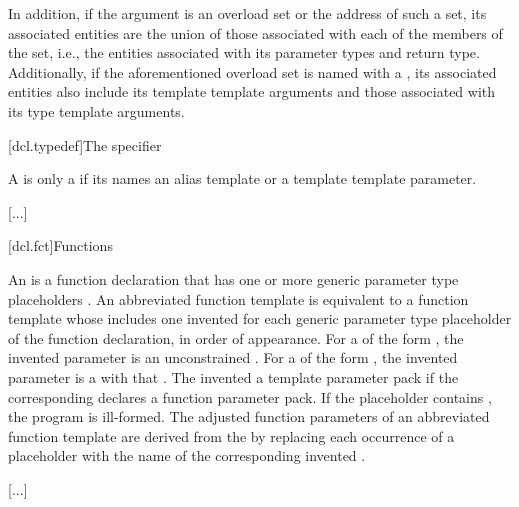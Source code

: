 \documentclass{wg21}
\begin{document}
In addition, if the argument is an overload set or the address of such a set,
its associated entities
are the union of those associated with each of the
members of the set, i.e., the entities associated with its
parameter types and return type.
Additionally, if the aforementioned overload set is named with
a , its associated entities also include
its  template template arguments and
those associated with its type template arguments.

[dcl.typedef]{The  specifier}%


\pnum
{}%
A  is only a 
if its  names
an alias template or a  template template parameter.
\begin{note}
    \textcolor{noteclr}{[...]}
\end{note}

[dcl.fct]{Functions}%

\pnum
An 
is a function declaration that has
one or more generic parameter type placeholders .
An abbreviated function template is equivalent to
a function template 
whose  includes
one invented 
for each generic parameter type placeholder
of the function declaration, in order of appearance.
For a  of the form ,
the invented parameter is
an unconstrained .
For a  of the form
 ,
the invented parameter is a  with
that .
The invented 
a template parameter pack
if the corresponding 
declares a function parameter pack.
If the placeholder contains ,
the program is ill-formed.
The adjusted function parameters of an abbreviated function template
are derived from the  by
replacing each occurrence of a placeholder with
the name of the corresponding invented .
\begin{example}
    \textcolor{noteclr}{[...]}
\end{example}
\end{document}
